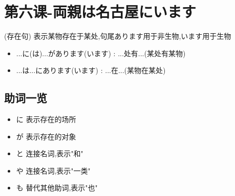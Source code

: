 
\usepackage{../../lectures_preamble}


    \section{第六课-両親は名古屋にいます}
    \begin{definition}
        (存在句) 表示某物存在于某处,句尾あります用于非生物,います用于生物
        \begin{itemize}
            \item ...に(は)...があります(います) : ...处有...(某处有某物)
            \item ...は...にあります(います) : ...在...(某物在某处)
        \end{itemize}
    \end{definition}
    \subsection{助词一览}
    \begin{itemize}
        \item に 表示存在的场所
        \item が 表示存在的对象
        \item と 连接名词,表示"和"
        \item や 连接名词,表示"一类"
        \item も 替代其他助词,表示"也"
    \end{itemize}

